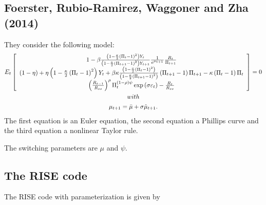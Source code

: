 \documentclass[letterpaper,10pt,english]{sphinxmanual}
\begin{document}
\subsection{Foerster, Rubio-Ramirez, Waggoner and Zha (2014)}
\label{getting_started_folder/tutorial:foerster-rubio-ramirez-waggoner-and-zha-2014}
They consider the following model:
\begin{gather}
\begin{split}E_{t}\left[
\begin{array}{c}
1-\beta\frac{\left( 1-\frac{\kappa}{2}\left( \Pi_{t}-1\right) ^{2}\right)
Y_{t}}{\left( 1-\frac{\kappa}{2}\left( \Pi_{t+1}-1\right) ^{2}\right) Y_{t+1}%
}\frac{1}{e^{\mu_{t+1}}}\frac{R_{t}}{\Pi_{t+1}} \\
\left( 1-\eta\right) +\eta\left( 1-\frac{\kappa}{2}\left( \Pi _{t}-1\right)
^{2}\right) Y_{t}+\beta\kappa\frac{\left( 1-\frac{\kappa}{2}\left(
\Pi_{t}-1\right) ^{2}\right) }{\left( 1-\frac{\kappa}{2}\left(
\Pi_{t+1}-1\right) ^{2}\right) }\left( \Pi_{t+1}-1\right)
\Pi_{t+1}-\kappa\left( \Pi_{t}-1\right) \Pi_{t} \\
\left( \frac{R_{t-1}}{R_{ss}}\right) ^{\rho}\Pi_{t}^{\left( 1-\rho\right)
\psi}\exp\left( \sigma\varepsilon_{t}\right) -\frac{R_{t}}{R_{ss}}%
\end{array}
\right] =0\end{split}\notag\\\begin{split}with\end{split}\notag\\\begin{split}\mu_{t+1}=\bar{\mu}+\sigma\hat{\mu}_{t+1}.\end{split}\notag
\end{gather}
The first equation is an Euler equation, the second equation a Phillips
curve and the third equation a nonlinear Taylor rule.

The switching parameters are $\mu$ and  $\psi$.


\subsection{The RISE code}
\label{getting_started_folder/tutorial:the-rise-code}
The RISE code with parameterization is given by
\end{document}
